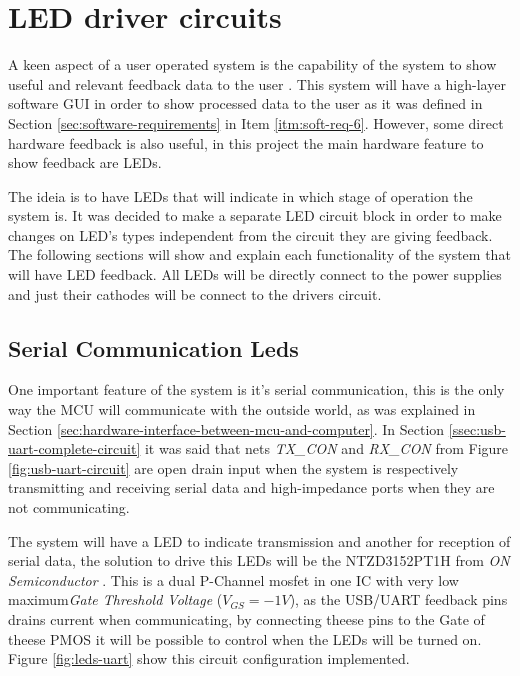 \section{LED driver circuits}\label{sec:led-driver-circuit}

	A keen aspect of a user operated system is the capability of the system to show useful and relevant feedback data to the user \cite{laurel1990art}. This system will have a high-layer software GUI in order to show processed data to the user as it was defined in Section \ref{sec:software-requirements} in Item \ref{itm:soft-req-6}. However, some direct hardware feedback is also useful, in this project the main hardware feature to show feedback are LEDs.
	\par
	The ideia is to have LEDs that will indicate in which stage of operation the system is. It was decided to make a separate LED circuit block in order to make changes on LED's types independent from the circuit they are giving feedback. The following sections will show and explain each functionality of the system that will have LED feedback. All LEDs will be directly connect to the power supplies and just their cathodes will be connect to the drivers circuit.
		
	\subsection{Serial Communication Leds}\label{ssec:serial-communication-leds}
		One important feature of the system is it's serial communication, this is the only way the MCU will communicate with the outside world, as was explained in Section \ref{sec:hardware-interface-between-mcu-and-computer}. In Section \ref{ssec:usb-uart-complete-circuit} it was said that nets \textit{TX_CON} and \textit{RX_CON} from Figure \ref{fig:usb-uart-circuit} are open drain input when the system is respectively transmitting and receiving serial data and high-impedance ports when they are not communicating.
		\par
		The system will have a LED to indicate transmission and another for reception of serial data, the solution to drive this LEDs will be the NTZD3152PT1H from \textit{ON Semiconductor} \cite{ntzd3152pt1h-datasheet}. This is a dual P-Channel mosfet in one IC with very low maximum\textit{Gate Threshold Voltage} ($V_{GS}=-1V$), as the USB/UART feedback pins drains current when communicating, by connecting theese pins to the Gate of theese PMOS it will be possible to control when the LEDs will be turned on. Figure \ref{fig:leds-uart} show this circuit configuration implemented.

